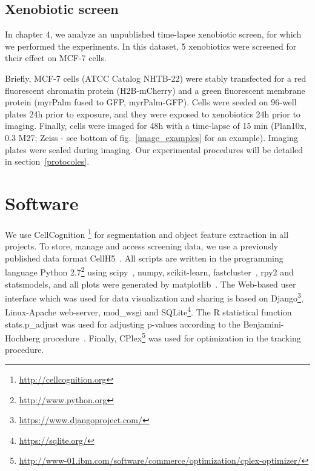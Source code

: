 \subsection{Xenobiotic screen}
In chapter 4, we analyze an unpublished time-lapse xenobiotic screen, for which we performed the experiments. In this dataset, 5 xenobiotics were screened for their effect on MCF-7 cells.

Briefly, MCF-7 cells (ATCC\up{\textregistered} Catalog NHTB-22\texttrademark) were stably transfected for a red fluorescent chromatin protein (H2B-mCherry) and a green fluorescent membrane protein (myrPalm fused to GFP, myrPalm-GFP). Cells were seeded on 96-well plates 24h prior to exposure, and they were exposed to xenobiotics 24h prior to imaging. Finally, cells were imaged for 48h with a time-lapse of 15 min (Plan10x, 0.3 M27; Zeiss - see bottom of fig.~\ref{image_examples} for an example). Imaging plates were sealed during imaging. Our experimental procedures will be detailed in section~\ref{protocoles}.

\section{Software}
We use CellCognition \cite{cellcognition}\footnote{\href{http://cellcognition.org}{http://cellcognition.org}} for segmentation and object feature extraction in all projects. To store, manage and access
screening data, we use a previously published data format CellH5~\cite{Sommer2013}. All scripts are written in the programming language Python 2.7\footnote{\href{http://www.python.org}{http://www.python.org}}
using scipy~\cite{scipy}, numpy, scikit-learn, fastcluster~\cite{fastcluster}, rpy2 and statsmodels, and all plots were generated by matplotlib~\cite{matplotlib}. The Web-based user interface which was used for data visualization and sharing is based on Django\footnote{\href{https://www.djangoproject.com/}{https://www.djangoproject.com/}}, Linux-Apache web-server, mod\_wsgi and SQLite\footnote{\href{https://sqlite.org/}{https://sqlite.org/}}.
The R statistical function stats.p\_adjust was used for adjusting p-values according to the Benjamini-Hochberg procedure~\cite{Benjamini1}. Finally, CPlex\footnote{\href{http://www-01.ibm.com/software/commerce/optimization/cplex-optimizer/}{http://www-01.ibm.com/software/commerce/optimization/cplex-optimizer/}} was used for optimization in the tracking procedure.